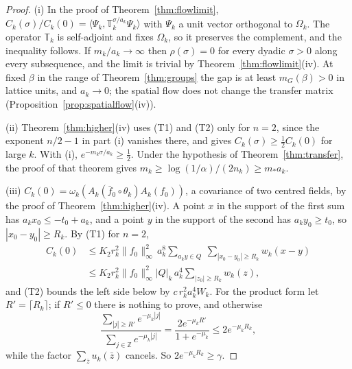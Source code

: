 \documentclass[aps,prd,twocolumn,superscriptaddress,nofootinbib,longbibliography,floatfix,amsmath,amssymb,10pt]{revtex4-2}
\theoremstyle{definition}
\theoremstyle{remark}
\newcommand{\Z}{\mathbb{Z}}
\newcommand{\ip}[2]{\langle #1,#2\rangle}
\begin{document}
\begin{proof}
(i) In the proof of Theorem~\ref{thm:flowlimit},
$C_k(\sigma)/C_k(0)=\ip{\Psi_k}{\mathbb T_k^{\sigma/a_k}\Psi_k}$ with
$\Psi_k$ a unit vector orthogonal to $\Omega_k$. The operator $\mathbb T_k$
is self-adjoint and fixes $\Omega_k$, so it preserves the complement, and the
inequality follows. If $m_k/a_k\to\infty$ then $\rho(\sigma)=0$ for every
dyadic $\sigma>0$ along every subsequence, and the limit is trivial by
Theorem~\ref{thm:flowlimit}(iv). At fixed $\beta$ in the range of
Theorem~\ref{thm:groups} the gap is at least $m_G(\beta)>0$ in lattice units,
and $a_k\to0$; the spatial flow does not change the transfer matrix
(Proposition~\ref{prop:spatialflow}(iv)).

(ii) Theorem~\ref{thm:higher}(iv) uses (T1) and (T2) only for $n=2$, since
the exponent $n/2-1$ in part (i) vanishes there, and gives
$C_k(\sigma)\ge\frac12C_k(0)$ for large $k$. With (i),
$e^{-m_k\sigma/a_k}\ge\frac12$. Under the hypothesis of
Theorem~\ref{thm:transfer}, the proof of that theorem gives
$m_k\ge\log(1/\alpha)/(2n_k)\ge m_*a_k$.

(iii) $C_k(0)=\omega_k(A_k(\bar f_0\circ\theta_k)A_k(f_0))$, a covariance of
two centred fields, by the proof of Theorem~\ref{thm:higher}(iv). A point $x$
in the support of the first sum has $a_kx_0\le-t_0+a_k$, and a point $y$ in
the support of the second has $a_ky_0\ge t_0$, so $|x_0-y_0|\ge R_k$. By
(T1) for $n=2$,
\[
\begin{split}
C_k(0)&\le K_2r_k^2\|f_0\|_\infty^2\,a_k^8\sum_{a_ky\in Q}\
\sum_{|x_0-y_0|\ge R_k}w_k(x-y)\\
&\le K_2r_k^2\|f_0\|_\infty^2|Q|_k\,a_k^4\sum_{|z_0|\ge R_k}w_k(z),
\end{split}
\]
and (T2) bounds the left side below by $c\,r_k^2a_k^4W_k$. For the product
form let $R'=\lceil R_k\rceil$; if $R'\le0$ there is nothing to prove, and
otherwise
\[
\frac{\sum_{|j|\ge R'}e^{-\mu_k|j|}}{\sum_{j\in\Z}e^{-\mu_k|j|}}
=\frac{2e^{-\mu_kR'}}{1+e^{-\mu_k}}\le2e^{-\mu_kR_k},
\]
while the factor $\sum_{\bar z}u_k(\bar z)$ cancels. So
$2e^{-\mu_kR_k}\ge\gamma$.
\end{proof}
\end{document}
